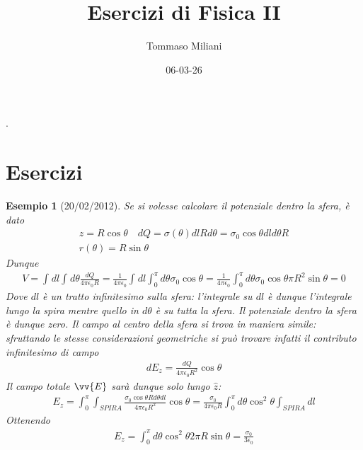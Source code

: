 \documentclass[a4paper, oneside]{article}
\title{Esercizi di Fisica II}
\author{Tommaso Miliani}
\date{06-03-26}
\begin{document}
                {}          %
                {}          %
                {\slshape}  %
                {}          %
                {\bfseries} %
                {.}         %
                {\newline}  %
                {}          %
\theoremstyle{theoremEnv}

\newtheorem{definition}{Definizione}[section]
\newtheorem{theorem}{Teorema}[section]
\newtheorem{lemma}{Proposizione}[section]
\newtheorem{observation}{Osservazione}[section]
\newtheorem{corollary}{Corollario}[theorem]
\newtheorem{example}{Esempio}[section]
\newtheorem{remark}{Enunciato}[section]

\maketitle

\section{Esercizi}
\begin{example}[20/02/2012]
    Se si volesse calcolare il potenziale dentro la sfera, è dato 
    \begin{gather*}
        z = R\cos\theta \quad dQ = \sigma(\theta)dl Rd\theta = \sigma_0\cos\theta dl d\theta R\\
        r(\theta) = R\sin\theta \quad 
    \end{gather*}
    Dunque 
    \begin{gather*}
        V = \int_{}^{} dl \int_{}^{} d\theta \frac{dQ}{4\pi\epsilon_0 R} = \frac{1}{4\pi \epsilon_0} \int_{}^{} dl \int_{0}^{\pi} d\theta \sigma_0\cos\theta = \frac{1}{4\pi\epsilon_0} \int_{0}^{\pi} d\theta \sigma_0 \cos\theta \pi R^{2} \sin\theta = 0 
    \end{gather*}
    Dove $dl$ è un tratto infinitesimo sulla sfera: l'integrale su $dl$ è dunque l'integrale lungo 
    la spira mentre quello in $d\theta$ è su tutta la sfera. Il potenziale dentro la sfera è 
    dunque zero. Il campo al centro della sfera si trova in maniera simile: sfruttando le stesse 
    considerazioni geometriche si può trovare 
    infatti il contributo infinitesimo di campo 
    \begin{gather*}
        dE_z = \frac{dQ}{4\pi\epsilon_0 R^{2}}\cos\theta
    \end{gather*}
    Il campo totale $\vv{E}$ sarà dunque solo lungo $\hat{z}$:
    \begin{gather*}
        E_z = \int_{0}^{\pi} \int_{SPIRA} \frac{\sigma_0 \cos\theta R d\theta dl}{4\pi\epsilon_0 R^{2}} \cos\theta = \frac{\sigma_0}{4\pi\epsilon_0 R} \int_{0}^{\pi} d\theta \cos^{2}\theta \int_{SPIRA}^{} dl      
    \end{gather*}  
    Ottenendo 
    \begin{gather*}
        E_z = \int_{0}^{\pi} d\theta \cos^{2}\theta 2\pi R\sin\theta = \frac{\sigma_0}{3\epsilon_0}
    \end{gather*}
\end{example}
\end{document}
